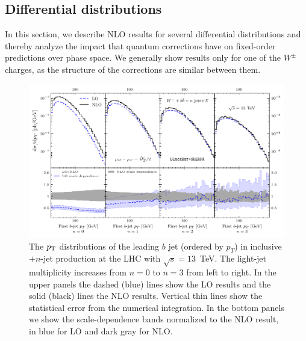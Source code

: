 \subsection{Differential distributions}
\label{diffxsw}

In this section, we describe NLO results for several differential
distributions and thereby analyze the impact
that quantum corrections have on fixed-order predictions over phase
space. We generally show results only for one of the $W^\pm$ charges, as the
structure of the corrections are similar between them. 

\begin{figure}[ht]
  \centering
  \includegraphics[clip,scale=1]{plots/ptleading}
  \caption{The $p_{\textrm T}$ distributions of the leading $b$ jet (ordered by $p_T$) in inclusive \Wbbm$+n$-jet
    production at the LHC with $\sqrt{s}=13$~TeV. The light-jet multiplicity 
    increases from $n=0$ to $n=3$ from left to right. In the upper panels the
    dashed (blue) lines show the LO results and the solid (black) lines the NLO
    results. Vertical thin lines show the statistical error from the numerical
    integration. In the bottom panels we show the scale-dependence bands
  normalized to the NLO result, in blue for LO and dark gray for NLO.}
  \label{fig_Wmnjpt}
\end{figure}


